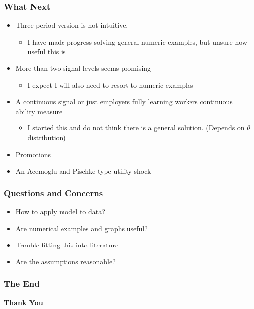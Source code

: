 \documentclass{beamer}
\begin{document}

\begin{frame}
\frametitle{What Next}
\begin{itemize}v
	\setlength{\itemsep}{5mm}
	\item Three period version is not intuitive. 
	\begin{itemize}
		\item I have made progress solving general numeric examples, but unsure how useful this is
	\end{itemize}
	\item More than two signal levels seems promising
	\begin{itemize}
		\item  I expect I will also need to resort to numeric examples 
	\end{itemize} 
	\item A continuous signal or just employers fully learning workers continuous ability measure 
	\begin{itemize}
		\item I started this and do not think there is a general solution. (Depends on $\theta$ distribution)
	\end{itemize}
	\item Promotions
	\item An Acemoglu and Pischke type utility shock 
\end{itemize}
\end{frame}

\begin{frame}
\frametitle{Questions and Concerns }
\begin{itemize}
	\setlength{\itemsep}{5mm}
	\item How to apply model to data?
	\item Are numerical examples and graphs useful?
	\item Trouble fitting this into literature 
	\item Are the assumptions reasonable? 
	
\end{itemize}
\end{frame}



\begin{frame}

\frametitle{The End }

\begin{center}
	
\begin{Huge}
\textbf{Thank You}
\end{Huge}
\end{center}
\end{frame}

\end{document}
